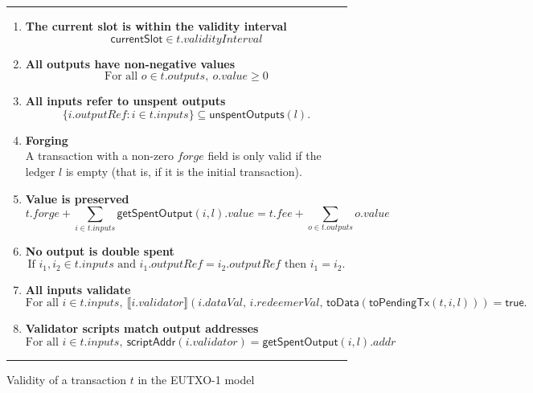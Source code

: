 \documentclass[a4paper]{article}
\renewcommand{\i}{\textit}  %
\newcommand{\s}{\textsf}  %
\newcommand{\msf}[1]{\ensuremath{\mathsf{#1}}}
\newcommand{\mi}[1]{\ensuremath{\mathit{#1}}}
\newcommand\rfskip{7pt}
\newenvironment{ruledfigure}[1]{\begin{figure}[#1]\hrule\vspace{\rfskip}}{\vspace{\rfskip}\hrule\end{figure}}
\newcommand{\true}{\textsf{true}}
\newcommand{\scriptAddr}{\msf{scriptAddr}}
\newcommand{\toData}{\ensuremath{\s{toData}}}
\newcommand{\toPendingTx}{\ensuremath{\s{toPendingTx}}}
\newcommand{\inputs}{\mi{inputs}}
\newcommand{\outputs}{\mi{outputs}}
\newcommand{\forge}{\mi{forge}}
\newcommand{\fee}{\mi{fee}}
\newcommand{\addr}{\mi{addr}}
\newcommand{\val}{\mi{value}}  %
\newcommand{\validator}{\mi{validator}}
\newcommand{\redeemerVal}{\mi{redeemerVal}}
\newcommand{\dataVal}{\mi{dataVal}}
\newcommand{\outputref}{\mi{outputRef}}
\newcommand{\getSpent}{\msf{getSpentOutput}}
\newcommand{\unspent}{\msf{unspentOutputs}}
\begin{document}
\begin{ruledfigure}{H}
\begin{enumerate}

\item
  \label{rule:slot-in-range}
  \textbf{The current slot is within the validity interval}
  \begin{displaymath}
    \msf{currentSlot} \in t.\i{validityInterval}
  \end{displaymath}

\item
  \label{rule:all-outputs-are-non-negative}
  \textbf{All outputs have non-negative values}
  \begin{displaymath}
    \textrm{For all } o \in t.\outputs,\ o.\val \geq 0
  \end{displaymath}

\item
  \label{rule:all-inputs-refer-to-unspent-outputs}
  \textbf{All inputs refer to unspent outputs}
  \begin{displaymath}
    \{i.\outputref: i \in t.\inputs \} \subseteq \unspent(l).
  \end{displaymath}

\item
  \label{rule:forging}
  \textbf{Forging} \\
    A transaction with a non-zero \forge{}
    field is only valid if the ledger $l$ is empty (that
    is, if it is the initial transaction).

\item
  \label{rule:value-is-preserved}
  \textbf{Value is preserved}
  \begin{displaymath}
    t.\forge + \sum_{i \in t.\inputs} \getSpent(i, l).\val = t.\fee + \sum_{o \in t.\outputs} o.\val
  \end{displaymath}

\item
  \label{rule:no-double-spending}
  \textbf{No output is double spent}
  \begin{displaymath}
    \textrm{If } i_1, i_2 \in t.\inputs \textrm{ and }  i_1.\outputref = i_2.\outputref
    \textrm{ then } i_1 = i_2.
  \end{displaymath}

\item
  \label{rule:all-inputs-validate}
  \textbf{All inputs validate}
  \begin{displaymath}
    \textrm{For all } i \in t.\inputs,\ \llbracket
    i.\validator\rrbracket (i.\dataVal,\, i.\redeemerVal,\,  \toData(\toPendingTx(t,i,l))) = \true.
  \end{displaymath}

\item
  \label{rule:validator-scripts-hash}
  \textbf{Validator scripts match output addresses}
  \begin{displaymath}
    \textrm{For all } i \in t.\inputs,\ \scriptAddr(i.\validator) = \getSpent(i, l).\addr
  \end{displaymath}

\end{enumerate}
\caption{Validity of a transaction $t$ in the EUTXO-1 model}
\label{fig:eutxo-1-validity}
\end{ruledfigure}
\end{document}
